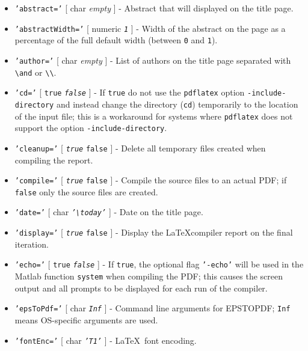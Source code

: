  \begin{itemize}
 \item
   \texttt{'abstract='} {[} char \textbar{} \emph{empty} {]} - Abstract
   that will displayed on the title page.
 \item
   \texttt{'abstractWidth='} {[} numeric \textbar{} \emph{\texttt{1}} {]}
   - Width of the abstract on the page as a percentage of the full
   default width (between \texttt{0} and \texttt{1}).
 \item
   \texttt{'author='} {[} char \textbar{} \emph{empty} {]} - List of
   authors on the title page separated with \texttt{\textbackslash{}and}
   or \texttt{\textbackslash{}\textbackslash{}}.
 \item
   \texttt{'cd='} {[} \texttt{true} \textbar{} \emph{\texttt{false}} {]}
   - If \texttt{true} do not use the \texttt{pdflatex} option
   \texttt{-include-directory} and instead change the directory
   (\texttt{cd}) temporarily to the location of the input file; this is a
   workaround for systems where \texttt{pdflatex} does not support the
   option \texttt{-include-directory}.
 \item
   \texttt{'cleanup='} {[} \emph{\texttt{true}} \textbar{} \texttt{false}
   {]} - Delete all temporary files created when compiling the report.
 \item
   \texttt{'compile='} {[} \emph{\texttt{true}} \textbar{} \texttt{false}
   {]} - Compile the source files to an actual PDF; if \texttt{false}
   only the source files are created.
 \item
   \texttt{'date='} {[} char \textbar{}
   \emph{\texttt{'\textbackslash{}today'}} {]} - Date on the title page.
 \item
   \texttt{'display='} {[} \emph{\texttt{true}} \textbar{} \texttt{false}
   {]} - Display the \LaTeX compiler report on the final iteration.
 \item
   \texttt{'echo='} {[} \texttt{true} \textbar{} \emph{\texttt{false}}
   {]} - If \texttt{true}, the optional flag \texttt{'-echo'} will be
   used in the Matlab function \texttt{system} when compiling the PDF;
   this causes the screen output and all prompts to be displayed for each
   run of the compiler.
 \item
   \texttt{'epsToPdf='} {[} char \textbar{} \emph{\texttt{Inf}} {]} -
   Command line arguments for EPSTOPDF; \texttt{Inf} means OS-specific
   arguments are used.
 \item
   \texttt{'fontEnc='} {[} char \textbar{} \emph{\texttt{'T1'}} {]} -
   \LaTeX~font encoding.

\end{itemize}
